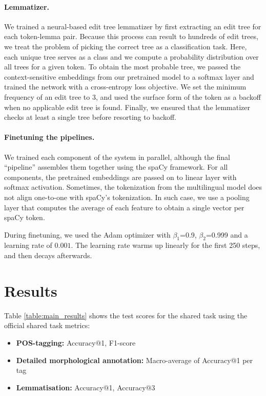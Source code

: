 \documentclass[11pt]{article}
\begin{document}
\paragraph{Lemmatizer.}
We trained a neural-based edit tree lemmatizer \cite{muller-etal-2015-joint} by first extracting an edit tree for each token-lemma pair.
Because this process can result to hundreds of edit trees, we treat the problem of picking the correct tree as a classification task.
Here, each unique tree serves as a class and we compute a probability distribution over all trees for a given token.
To obtain the most probable tree, we passed the context-sensitive embeddings from our pretrained model to a softmax layer and trained the network with a cross-entropy loss objective.
We set the minimum frequency of an edit tree to 3, and used the surface form of the token as a backoff when no applicable edit tree is found.
Finally, we ensured that the lemmatizer checks at least a single tree before resorting to backoff.

\paragraph{Finetuning the pipelines.} We trained each component of the system in parallel, although the final ``pipeline'' assembles them together using the spaCy framework.
For all components, the pretrained embeddings are passed on to linear layer with softmax activation.
Sometimes, the tokenization from the multilingual model does not align one-to-one with spaCy's tokenization.
In such case, we use a pooling layer that computes the average of each feature to obtain a single vector per spaCy token.

During finetuning, we used the Adam optimizer with $\beta_1$=0.9, $\beta_2$=0.999 and a learning rate of $0.001$.
The learning rate warms up linearly for the first 250 steps, and then decays afterwards.

\section{Results}

Table \ref{table:main_results} shows the test scores for the shared task using the official shared task metrics:

\begin{itemize}
  \item \textbf{POS-tagging:}	Accuracy@1, F1-score
  \item \textbf{Detailed morphological annotation:} Macro-average of Accuracy@1 per tag
  \item \textbf{Lemmatisation:} Accuracy@1, Accuracy@3
\end{itemize}
\end{document}
